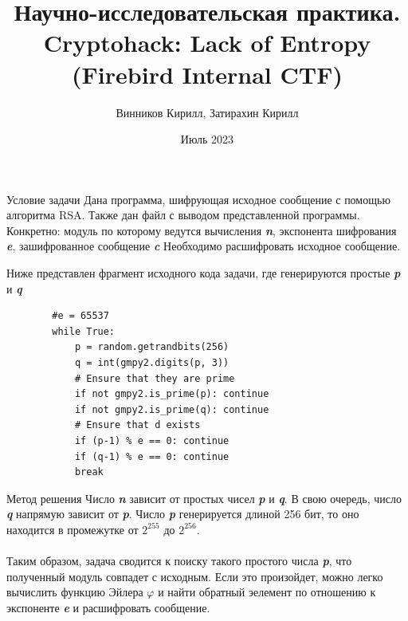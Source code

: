 \documentclass[10pt, aspectratio=169]{beamer}
\title{Научно-исследовательская практика. Cryptohack: Lack of Entropy (Firebird Internal CTF)}
\author{Винников Кирилл, Затирахин Кирилл }
\date{Июль 2023}
\begin{document}
\maketitle

\begin{frame}[fragile]{Условие задачи}
    Дана программа, шифрующая исходное сообщение с помощью алгоритма RSA. Также дан файл с выводом представленной программы. Конкретно: модуль по которому ведутся вычисления \textbf{\emph{n}}, экспонента шифрования \textbf{\emph{e}}, зашифрованное сообщение \textbf{\emph{c}} Необходимо расшифровать исходное сообщение.

    Ниже представлен фрагмент исходного кода задачи, где генерируются простые \textbf{\emph{p}} и \textbf{\emph{q}}

    \begin{verbatim}
        #e = 65537
        while True:
            p = random.getrandbits(256)
            q = int(gmpy2.digits(p, 3))
            # Ensure that they are prime
            if not gmpy2.is_prime(p): continue
            if not gmpy2.is_prime(q): continue
            # Ensure that d exists
            if (p-1) % e == 0: continue
            if (q-1) % e == 0: continue
            break
    \end{verbatim}
    
\end{frame}

\begin{frame}[fragile]{Метод решения}
    Число \textbf{\emph{n}} зависит от простых чисел \textbf{\emph{p}} и \textbf{\emph{q}}. В свою очередь, число \textbf{\emph{q}} напрямую зависит от \textbf{\emph{p}}. Число \textbf{\emph{p}} генерируется длиной 256 бит, то оно находится в промежутке от $2^{255}$ до $2^{256}$. \\\\Таким образом, задача сводится к поиску такого простого числа \textbf{\emph{p}}, что полученный модуль совпадет с исходным. Если это произойдет, можно легко вычислить функцию Эйлера $\varphi$ и найти обратный эелемент по отношению к экспоненте \textbf{\emph{e}} и расшифровать сообщение.
\end{frame}
\end{document}
